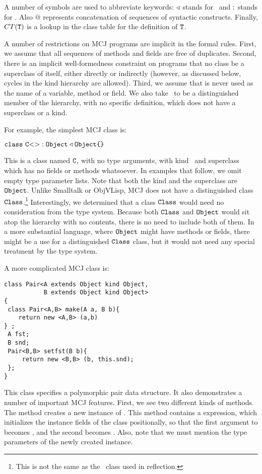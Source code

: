 \documentclass{acm-sigplan}
\begin{document}
A number of symbols are used to abbreviate keywords: $\triangleleft$
stands for \extends\ and $:$ stands for \kind. Also
$@$ represents concatenation of sequences of syntactic constructs.
Finally, $CT(\mathtt{{T}})$ is a lookup in the class table for the definition of
$\mathtt{{T}}$.

A number of restrictions on MCJ programs are implicit in the formal
rules.  First, we assume that all sequences of methods and fields are
free of duplicates.  Second, there is an implicit well-formedness
constraint on programs that no class be a superclass of itself, either
directly or indirectly (however, as discussed below, cycles in the
kind hierarchy are allowed).  Third, we assume that \this is
never used as the name of a variable, method or field.  We also take
\Object\ to be a distinguished member of the hierarchy, with no
specific definition, which does not have a superclass or a kind.

For example, the simplest MCJ class is:

\vspace{.1cm}
$\mathtt{{class}}\ {\mathtt{{C}}}\mathtt{{<}}\mathtt{{>}} : \mbox{\tt Object} \triangleleft \mbox{\tt Object} \mbox{\tt \{}\mbox{\tt \}}$
\vspace{.1cm}

This is a class named $\mathtt{{C}}$, with no type arguments, with kind \Object\
and superclass \Object\, which has no fields or methods whatsoever.
In examples that follow, we omit empty type parameter lists.  Note
that both the kind and the superclass are $\mbox{\tt Object}$.  Unlike Smalltalk
or ObjVLisp, MCJ does not have a distinguished class
$\mbox{\tt Class}$.\footnote{This is not the same as the \Class\ class used in
reflection.}  Interestingly, we determined that a class $\mbox{\tt Class}$ would
need no consideration from the type system.  Because both $\mbox{\tt Class}$ and
$\mbox{\tt Object}$ would sit atop the hierarchy with no contents, there is no
need to include both of them.  In a more substantial language, where
$\mbox{\tt Object}$ might have methods or fields, there might be a use for a
distinguished $\mbox{\tt Class}$ class, but it would not need any special
treatment by the type system.

A more complicated MCJ class is:

\begin{verbatim}
class Pair<A extends Object kind Object,
           B extends Object kind Object>
{
 class Pair<A,B> make(A a, B b){ 
    return new <A,B> (a,b) 
} ;
 A fst;
 B snd;
 Pair<B,B> setfst(B b){
     return new <B,B> (b, this.snd);
 };
}
\end{verbatim}

This class specifies a polymorphic pair data structure.  It also
demonstrates a number of important MCJ features.  First, we see two
different kinds of methods.  The {\txt{make}} method creates a new
instance of {\txt{Pair}}.  This method contains a {\txt{new}}
expression, which initializes the instance fields of the class
positionally, so that the first argument to {} becomes
{\txt{fst}}, and the second becomes {\txt{snd}}.  Also, note that we
must mention the type parameters of the newly created instance.
\end{document}
